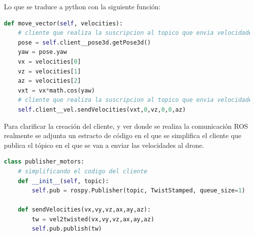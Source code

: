 \begin{itemize}
\begin{itemize}
Lo que se traduce a python con la siguiente función:\\
  	
\begin{lstlisting}[language=python,firstnumber=1]
 def move_vector(self, velocities):
    # cliente que realiza la suscripcion al topico que envia velocidades
    pose = self.client__pose3d.getPose3d()
    yaw = pose.yaw
    vx = velocities[0]
    vz = velocities[1]
    az = velocities[2]
    vxt = vx*math.cos(yaw)
    # cliente que realiza la suscripcion al topico que envia velocidades
    self.client__vel.sendVelocities(vxt,0,vz,0,0,az)
\end{lstlisting}
	
	Para clarificar la creación del cliente, y ver donde se realiza la comunicación ROS realmente se adjunta un estracto de código en el que se simplifica el cliente que publica el tópico en el que se van a enviar las velocidades al drone.\\
	
\begin{lstlisting}[language=python,firstnumber=1]
class publisher_motors:
    # simplificando el codigo del cliente
    def __init__(self, topic):
        self.pub = rospy.Publisher(topic, TwistStamped, queue_size=1)

    def sendVelocities(vx,vy,vz,ax,ay,az):
        tw = vel2twisted(vx,vy,vz,ax,ay,az)
        self.pub.publish(tw)
\end{lstlisting}
	
	\end{itemize}
\end{itemize}



